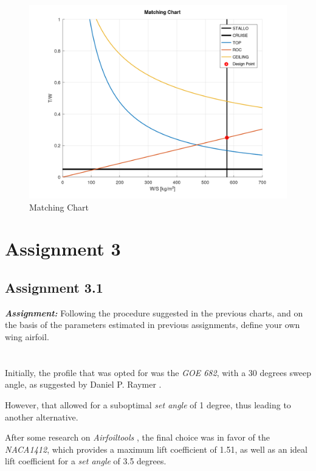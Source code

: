\documentclass{article}
\begin{document}
\begin{figure}[h!]
    \centering
    \includegraphics[width=\textwidth]{Sources/Plots_and_Pictures/Matching_chart.png}
    \caption{Matching Chart}
    \label{matching_chart}
\end{figure}
\clearpage

\section{Assignment 3\label{Assignment_3}}

\subsection{Assignment 3.1\label{Assignment_3.1}}

\textbf{\textit{Assignment:}} Following the procedure suggested in the previous charts,
and on the basis of the parameters estimated in previous assignments,
define your own wing airfoil. \\ \\ \\ 

Initially, the profile that was opted for was the \textit{GOE 682}, with a 30 degrees sweep angle, 
as suggested by Daniel P. Raymer \autocite{Raymer_Daniel}.

However, that allowed for a suboptimal \textit{set angle} of 1 degree, thus leading to another alternative.

After some research on \textit{Airfoiltools} \autocite{Airfoiltools}, the final choice was in favor
of the \textit{NACA1412}, which provides a maximum lift coefficient of 1.51, as well as an ideal lift coefficient
for a \textit{set angle} of 3.5 degrees.
\end{document}
